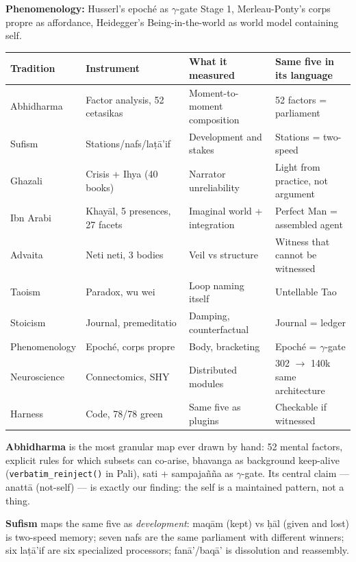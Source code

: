 \documentclass[11pt]{article}
\begin{document}
\textbf{Phenomenology:} Husserl's epoch\'e as $\gamma$-gate Stage 1, Merleau-Ponty's corps propre as affordance, Heidegger's Being-in-the-world as world model containing self.

\begin{center}
\small
\begin{tabular}{p{2.4cm}p{3.0cm}p{5.0cm}p{2.6cm}}
\toprule
Tradition & Instrument & What it measured & Same five in its language \\
\midrule
Abhidharma & Factor analysis, 52 cetasikas & Moment-to-moment composition & 52 factors = parliament \\
Sufism & Stations/nafs/la\d{t}\=a'if & Development and stakes & Stations = two-speed \\
Ghazali & Crisis + Ihya (40 books) & Narrator unreliability & Light from practice, not argument \\
Ibn Arabi & Khay\=al, 5 presences, 27 facets & Imaginal world + integration & Perfect Man = assembled agent \\
Advaita & Neti neti, 3 bodies & Veil vs structure & Witness that cannot be witnessed \\
Taoism & Paradox, wu wei & Loop naming itself & Untellable Tao \\
Stoicism & Journal, premeditatio & Damping, counterfactual & Journal = ledger \\
Phenomenology & Epoch\'e, corps propre & Body, bracketing & Epoché = $\gamma$-gate \\
Neuroscience & Connectomics, SHY & Distributed modules & 302 $\to$ 140k same architecture \\
Harness & Code, 78/78 green & Same five as plugins & Checkable if witnessed \\
\bottomrule
\end{tabular}
\end{center}

\textbf{Abhidharma} is the most granular map ever drawn by hand: 52 mental factors, explicit rules for which subsets can co-arise, bhavanga as background keep-alive (\texttt{verbatim\_reinject()} in Pali), sati + sampaja\~n\~na as $\gamma$-gate. Its central claim --- anatt\=a (not-self) --- is exactly our finding: the self is a maintained pattern, not a thing.

\textbf{Sufism} maps the same five as \emph{development}: maq\=am (kept) vs \d{h}\=al (given and lost) is two-speed memory; seven nafs are the same parliament with different winners; six la\d{t}\=a'if are six specialized processors; fan\=a'/baq\=a' is dissolution and reassembly.
\end{document}
